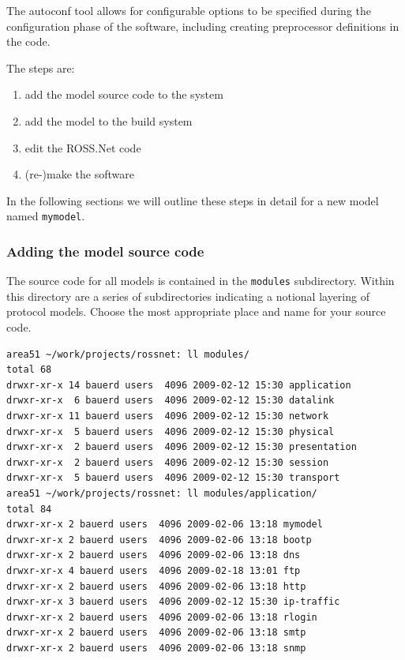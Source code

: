 \documentclass[12pt]{article}
\begin{document}
The autoconf tool allows for configurable options to be specified during the
configuration phase of the software, including creating preprocessor
definitions in the code.

The steps are:

\begin{enumerate}
  \item add the model source code to the system
  \item add the model to the build system
  \item edit the ROSS.Net code
  \item (re-)make the software
\end{enumerate}

In the following sections we will outline these steps in detail for a new
model named {\tt mymodel}.

\subsubsection{Adding the model source code}

The source code for all models is contained in the {\tt modules}
subdirectory. Within this directory are a series of subdirectories indicating
a notional layering of protocol models.  Choose the most appropriate place and
name for your source code.

\begin{small}\begin{verbatim}
area51 ~/work/projects/rossnet: ll modules/
total 68
drwxr-xr-x 14 bauerd users  4096 2009-02-12 15:30 application
drwxr-xr-x  6 bauerd users  4096 2009-02-12 15:30 datalink
drwxr-xr-x 11 bauerd users  4096 2009-02-12 15:30 network
drwxr-xr-x  5 bauerd users  4096 2009-02-12 15:30 physical
drwxr-xr-x  2 bauerd users  4096 2009-02-12 15:30 presentation
drwxr-xr-x  2 bauerd users  4096 2009-02-12 15:30 session
drwxr-xr-x  5 bauerd users  4096 2009-02-12 15:30 transport
area51 ~/work/projects/rossnet: ll modules/application/
total 84
drwxr-xr-x 2 bauerd users  4096 2009-02-06 13:18 mymodel
drwxr-xr-x 2 bauerd users  4096 2009-02-06 13:18 bootp
drwxr-xr-x 2 bauerd users  4096 2009-02-06 13:18 dns
drwxr-xr-x 4 bauerd users  4096 2009-02-18 13:01 ftp
drwxr-xr-x 2 bauerd users  4096 2009-02-06 13:18 http
drwxr-xr-x 3 bauerd users  4096 2009-02-12 15:30 ip-traffic
drwxr-xr-x 2 bauerd users  4096 2009-02-06 13:18 rlogin
drwxr-xr-x 2 bauerd users  4096 2009-02-06 13:18 smtp
drwxr-xr-x 2 bauerd users  4096 2009-02-06 13:18 snmp
\end{verbatim}
\end{small}
\end{document}
